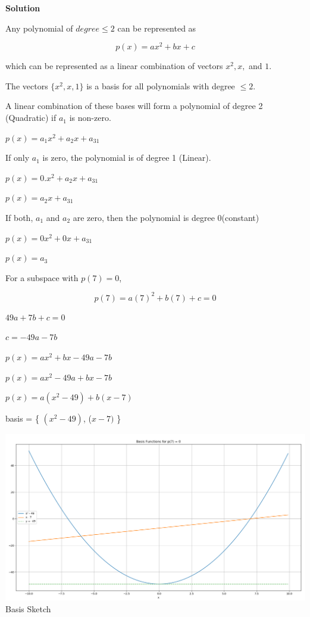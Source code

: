 \documentclass[a4paper, 11pt]{article}
\begin{document}
\begin{enumerate}
\textbf{Solution}


Any polynomial of $degree \leq 2$ can be represented as 

\begin{equation}
    p(x) = ax^2 + bx + c
\end{equation}{}

which can be represented as a linear combination of vectors $x^2, x,$  and $1$.

The vectors $\{ x^2, x, 1 \}$ is a basis for all polynomials with degree $\leq 2$. 

A linear combination of these bases will form a polynomial of degree 2 (Quadratic) if $a_1$ is non-zero. 

\begin{center}
    $p(x) = a_1x^2 + a_2x + a_31$
\end{center}

If only $a_1$ is zero, the polynomial is of degree 1 (Linear). 

\begin{center}
    $p(x) = 0.x^2 + a_2x + a_31$
    
    $p(x) = a_2x + a_31$
\end{center}

If both, $a_1$ and $a_2$ are zero, then the polynomial is degree 0(constant)

\begin{center}
    $p(x) = 0x^2 + 0x + a_31$
    
    $p(x) = a_3$

\end{center}

For a subspace with $p(7) = 0$, 

\begin{equation}
    p(7) = a(7)^2 + b(7) + c = 0
\end{equation}

\begin{center}
    $49a + 7b + c = 0$
    
    $c = -49a -7b$
    
    $p(x) = ax^2 + bx -49a -7b$
    
    $p(x) = ax^2 -49a + bx -7b$
    
    $p(x) = a(x^2 - 49) + b(x - 7)$
    
    basis = \{ $(x^2 -49)$, ($x -7)$ \}

    \includegraphics[width=\linewidth]{figs/Q2basis.png}
    Basis Sketch
\end{center}



\end{enumerate}
\end{document}
